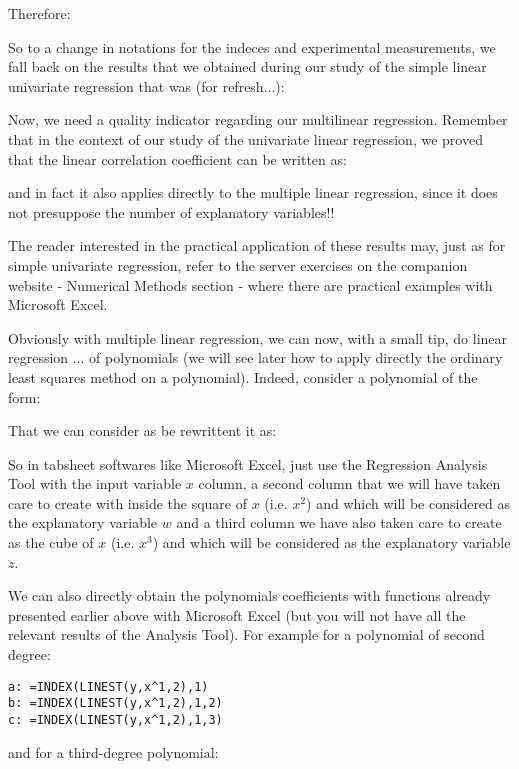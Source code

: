 	Therefore:
	
	So to a change in notations for the indeces and experimental measurements, we fall back on the results that we obtained during our study of the simple linear univariate regression that was (for refresh...):
	
	Now, we need a quality indicator regarding our multilinear regression. Remember that in the context of our study of the univariate linear regression, we proved that the linear correlation coefficient can be written as:
	
	and in fact it also applies directly to the multiple linear regression, since it does not presuppose the number of explanatory variables!!
	
	\begin{tcolorbox}[title=Remark,colframe=black,arc=10pt]
	The reader interested in the practical application of these results may, just as for simple univariate regression, refer to the server exercises on the companion website - Numerical Methods section - where there are practical examples with Microsoft Excel.
	\end{tcolorbox}	
	Obviously with multiple linear regression, we can now, with a small tip, do linear regression ... of polynomials (we will see later how to apply directly the ordinary least squares method on a polynomial). Indeed, consider a polynomial of the form:
	
	That we can consider as be rewrittent it as:
	
	So in tabsheet softwares like Microsoft Excel, just use the Regression Analysis Tool with the input variable $x$ column, a second column that we will have taken care to create with inside the square of $x$ (i.e. $x^2$) and which will be considered as the explanatory variable $w$ and a third column we have also taken care to create as the cube of $x$ (i.e. $x^3$) and which will be considered as the explanatory variable $z$.
	
	We can also directly obtain the polynomials coefficients with functions already presented earlier above with Microsoft Excel (but you will not have all the relevant results of the Analysis Tool). For example for a polynomial of second degree:
	
	\texttt{a: =INDEX(LINEST(y,x\string^{1,2}),1)\\
	b: =INDEX(LINEST(y,x\string^{1,2}),1,2)\\
	c: =INDEX(LINEST(y,x\string^{1,2}),1,3)
	}
	
	and for a third-degree polynomial:
	
